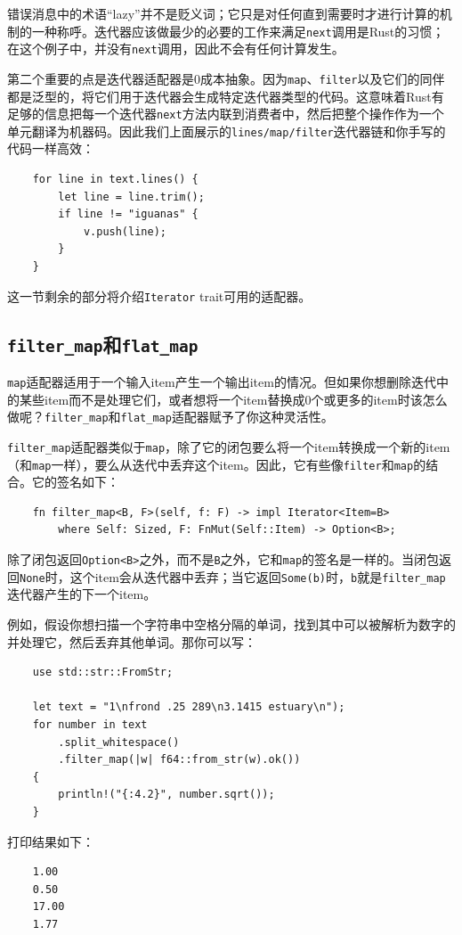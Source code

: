 错误消息中的术语“lazy”并不是贬义词；它只是对任何直到需要时才进行计算的机制的一种称呼。迭代器应该做最少的必要的工作来满足\texttt{next}调用是Rust的习惯；在这个例子中，并没有\texttt{next}调用，因此不会有任何计算发生。

第二个重要的点是迭代器适配器是0成本抽象。因为\texttt{map}、\texttt{filter}以及它们的同伴都是泛型的，将它们用于迭代器会生成特定迭代器类型的代码。这意味着Rust有足够的信息把每一个迭代器\texttt{next}方法内联到消费者中，然后把整个操作作为一个单元翻译为机器码。因此我们上面展示的\texttt{lines/map/filter}迭代器链和你手写的代码一样高效：
\begin{verbatim}
    for line in text.lines() {
        let line = line.trim();
        if line != "iguanas" {
            v.push(line);
        }
    }
\end{verbatim}

这一节剩余的部分将介绍\texttt{Iterator} trait可用的适配器。

\subsection{\texttt{filter\_map}和\texttt{flat\_map}}
\texttt{map}适配器适用于一个输入item产生一个输出item的情况。但如果你想删除迭代中的某些item而不是处理它们，或者想将一个item替换成0个或更多的item时该怎么做呢？\texttt{filter\_map}和\texttt{flat\_map}适配器赋予了你这种灵活性。

\texttt{filter\_map}适配器类似于\texttt{map}，除了它的闭包要么将一个item转换成一个新的item（和\texttt{map}一样），要么从迭代中丢弃这个item。因此，它有些像\texttt{filter}和\texttt{map}的结合。它的签名如下：
\begin{verbatim}
    fn filter_map<B, F>(self, f: F) -> impl Iterator<Item=B>
        where Self: Sized, F: FnMut(Self::Item) -> Option<B>;
\end{verbatim}

除了闭包返回\texttt{Option<B>}之外，而不是\texttt{B}之外，它和\texttt{map}的签名是一样的。当闭包返回\texttt{None}时，这个item会从迭代器中丢弃；当它返回\texttt{Some(b)}时，\texttt{b}就是\texttt{filter\_map}迭代器产生的下一个item。

例如，假设你想扫描一个字符串中空格分隔的单词，找到其中可以被解析为数字的并处理它，然后丢弃其他单词。那你可以写：
\begin{verbatim}
    use std::str::FromStr;

    let text = "1\nfrond .25 289\n3.1415 estuary\n");
    for number in text
        .split_whitespace()
        .filter_map(|w| f64::from_str(w).ok())
    {
        println!("{:4.2}", number.sqrt());
    }
\end{verbatim}
打印结果如下：
\begin{verbatim}
    1.00
    0.50
    17.00
    1.77
\end{verbatim}

